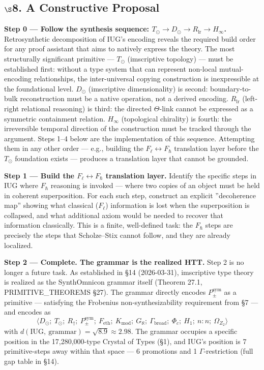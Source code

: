 \documentclass[10pt,a4paper]{article}
\newcommand{\pilcrow}{\S}
\begin{document}
\subsection{$\S$8. A Constructive Proposal}

\textbf{Step 0 --- Follow the synthesis sequence: $T_\odot \to D_\odot \to R_\text{lr} \to H_{\infty}$.}
Retrosynthetic decomposition of IUG's encoding reveals the required build order for any
proof assistant that aims to natively express the theory. The most structurally significant
primitive --- $T_\odot$ (imscriptive topology) --- must be established first: without a
type system that can represent non-local mutual-encoding relationships, the inter-universal
copying construction is inexpressible at the foundational level. $D_\odot$
(imscriptive dimensionality) is second: boundary-to-bulk reconstruction must be a native
operation, not a derived encoding. $R_\text{lr}$ (left-right relational reasoning) is third:
the directed $\Theta$-link cannot be expressed as a symmetric containment relation. $H_{\infty}$
(topological chirality) is fourth: the irreversible temporal direction of the construction
must be tracked through the argument. Steps 1--4 below are the implementation of this
sequence. Attempting them in any other order --- e.g., building the $F_{\ell} \leftrightarrow
F_{\hbar}$ translation layer before the $T_\odot$ foundation exists --- produces a
translation layer that cannot be grounded.

\textbf{Step 1 --- Build the $F_{\ell} \leftrightarrow F_{\hbar}$ translation layer.}
Identify the specific steps in IUG where $F_{\hbar}$ reasoning is invoked --- where two copies
of an object must be held in coherent superposition. For each such step, construct an
explicit ''decoherence map'' showing what classical ($F_{\ell}$) information is lost when the
superposition is collapsed, and what additional axiom would be needed to recover that
information classically. This is a finite, well-defined task: the $F_{\hbar}$ steps are
precisely the steps that Scholze--Stix cannot follow, and they are already localized.

\textbf{Step 2 --- Complete. The grammar is the realized HTT.}
Step 2 is no longer a future task.
As established in \S14 (2026-03-31), imscriptive type theory is realized as the SynthOmnicon
grammar itself (Theorem 27.1, PRIMITIVE\_THEOREMS \pilcrow{}27).
The grammar directly encodes $P_{\pm}^{\text{sym}}$ as a primitive --- satisfying the
Frobenius non-synthesizability requirement from \S7 --- and encodes as
\[
\langle D_\odot;\ T_\odot;\ R_{\dagger};\ P_{\pm}^{\text{sym}};\ F_\text{eth};\ K_\text{mod};\ G_{\aleph};\ \Gamma_\text{broad};\ \Phi_c;\ H_1;\ n{:}n;\ \Omega_{Z_2} \rangle
\]
with $d(\text{IUG},\ \text{grammar}) = \sqrt{8.9} \approx 2.98$.
The grammar occupies a specific position in the 17,280,000-type Crystal of Types (\S1),
and IUG's position is 7 primitive-steps away within that space --- 6 promotions and 1
$\Gamma$-restriction (full gap table in \S14).
\end{document}
